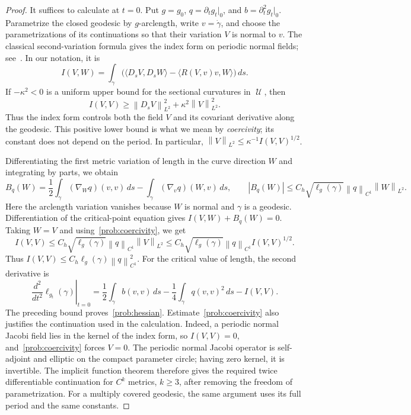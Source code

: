 \documentclass[10pt,oneside,reqno]{amsproc}
\numberwithin{equation}{section}
\theoremstyle{definition}
\theoremstyle{remark}
\newcommand{\norm}[1]{\left\|#1\right\|}
\DeclareMathOperator{\cU}{{\mathscr U}}
\renewcommand{\ge}{\geqslant}
\renewcommand{\le}{\leqslant}
\begin{document}
\begin{proof}
It suffices to calculate at $t=0$. Put $g=g_0$, $q=\partial_tg_t|_0$, and $b=\partial_t^2g_t|_0$. Parametrize the closed geodesic by $g$-arclength, write $v=\dot\gamma$, and choose the parametrizations of its continuations so that their variation $V$ is normal to $v$. The classical second-variation formula gives the index form on periodic normal fields; see~\cite[Chapter~XI, Section~1]{Lang}. In our notation, it is
\[
 I(V,W)=\int_\gamma\bigl(\langle D_sV,D_sW\rangle-\langle R(V,v)v,W\rangle\bigr)\,ds.
\]
If $-\kappa^2<0$ is a uniform upper bound for the sectional curvatures in $\cU$, then
\begin{equation}
 I(V,V)\ge\norm{D_sV}_{L^2}^2+\kappa^2\norm{V}_{L^2}^2.
 \label{prob:coercivity}
\end{equation}
Thus the index form controls both the field $V$ and its covariant derivative along the geodesic. This positive lower bound is what we mean by \emph{coercivity}; its constant does not depend on the period. In particular, $\norm{V}_{L^2}\le\kappa^{-1}I(V,V)^{1/2}$.

Differentiating the first metric variation of length in the curve direction $W$ and integrating by parts, we obtain
\[
 B_q(W)=\frac12\int_\gamma(\nabla_Wq)(v,v)\,ds-\int_\gamma(\nabla_vq)(W,v)\,ds,\qquad |B_q(W)|\le C_h\sqrt{\ell_g(\gamma)}\norm{q}_{C^1}\norm{W}_{L^2}.
\]
Here the arclength variation vanishes because $W$ is normal and $\gamma$ is a geodesic. Differentiation of the critical-point equation gives $I(V,W)+B_q(W)=0$. Taking $W=V$ and using~\eqref{prob:coercivity}, we get
\[
 I(V,V)\le C_h\sqrt{\ell_g(\gamma)}\norm{q}_{C^1}\norm{V}_{L^2}\le C_h\sqrt{\ell_g(\gamma)}\norm{q}_{C^1}I(V,V)^{1/2}.
\]
Thus $I(V,V)\le C_h\ell_g(\gamma)\norm{q}_{C^1}^2$. For the critical value of length, the second derivative is
\[
 \left.\frac{d^2}{dt^2}\ell_{g_t}(\gamma)\right|_{t=0}=\frac12\int_\gamma b(v,v)\,ds-\frac14\int_\gamma q(v,v)^2\,ds-I(V,V).
\]
The preceding bound proves~\eqref{prob:hessian}. Estimate~\eqref{prob:coercivity} also justifies the continuation used in the calculation. Indeed, a periodic normal Jacobi field lies in the kernel of the index form, so $I(V,V)=0$, and~\eqref{prob:coercivity} forces $V=0$. The periodic normal Jacobi operator is self-adjoint and elliptic on the compact parameter circle; having zero kernel, it is invertible. The implicit function theorem therefore gives the required twice differentiable continuation for $C^k$ metrics, $k\ge3$, after removing the freedom of parametrization. For a multiply covered geodesic, the same argument uses its full period and the same constants.
\end{proof}
\end{document}
